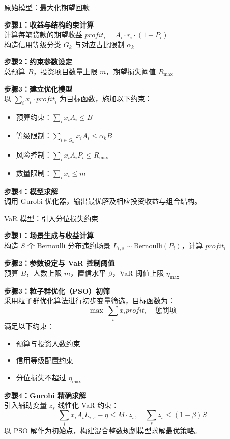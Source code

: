 \documentclass{write_paper}
\begin{document}
\begin{algorithm}[htbp]  \footnotesize
\caption{原始模型：最大化期望回款}
\label{alg:primal_model}

\textbf{步骤1：收益与结构约束计算} \\
计算每笔贷款的期望收益 $profit_i = A_i \cdot r_i \cdot (1 - P_i)$ \\
构造信用等级分类 $G_k$ 与对应占比限制 $\alpha_k$

\textbf{步骤2：约束参数设定} \\
总预算 $B$，投资项目数量上限 $m$，期望损失阈值 $R_{\max}$

\textbf{步骤3：建立优化模型} \\
以 $\sum_i x_i \cdot profit_i$ 为目标函数，施加以下约束：
\begin{itemize}
  \item 预算约束：$\sum_i x_i A_i \leq B$
  \item 等级限制：$\sum_{i \in G_k} x_i A_i \leq \alpha_k B$
  \item 风险控制：$\sum_i x_i A_i P_i \leq R_{\max}$
  \item 数量限制：$\sum_i x_i \leq m$
\end{itemize}

\textbf{步骤4：模型求解} \\
调用 Gurobi 优化器，输出最优解及相应投资收益与组合结构。
\end{algorithm}

\begin{algorithm}[htbp]  \footnotesize
\caption{VaR 模型：引入分位损失约束}
\label{alg:var_model}

\textbf{步骤1：场景生成与收益计算} \\
构造 $S$ 个 Bernoulli 分布违约场景 $L_{i,s} \sim \text{Bernoulli}(P_i)$，计算 $profit_i$

\textbf{步骤2：参数设定与 VaR 控制阈值} \\
预算 $B$，人数上限 $m$，置信水平 $\beta$，VaR 阈值上限 $\eta_{\max}$

\textbf{步骤3：粒子群优化（PSO）初筛} \\
采用粒子群优化算法进行初步变量筛选，目标函数为：
\[
\max\ \sum_i x_i profit_i - \text{惩罚项}
\]
满足以下约束：
\begin{itemize}
  \item 预算与投资人数约束
  \item 信用等级配置约束
  \item 分位损失不超过 $\eta_{\max}$
\end{itemize}

\textbf{步骤4：Gurobi 精确求解} \\
引入辅助变量 $z_s$ 线性化 VaR 约束：
\[
\sum_i x_i A_i L_{i,s} - \eta \leq M \cdot z_s,\quad \sum_s z_s \leq (1 - \beta) S
\]
以 PSO 解作为初始点，构建混合整数规划模型求解最优策略。
\end{algorithm}
\end{document}
